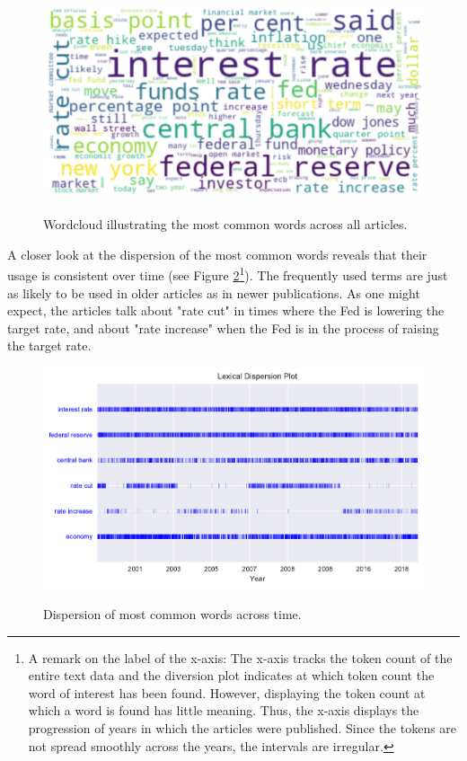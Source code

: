 \documentclass[11pt,a4paper,english,oneside]{book}
\numberwithin{equation}{chapter}
\begin{document}
\begin{figure}
	\caption{Wordcloud illustrating the most common words across all articles.}
	\centering
	\includegraphics[scale=0.2]{Images/wordcloud.pdf}
	\label{wcloud}
\end{figure}

A closer look at the dispersion of the most common words reveals that their usage is consistent over time (see Figure \ref{dispersion}\footnote{A remark on the label of the x-axis: The x-axis tracks the token count of the entire text data and the diversion plot indicates at which token count the word of interest has been found. However, displaying the token count at which a word is found has little meaning. Thus, the x-axis displays the progression of years in which the articles were published. Since the tokens are not spread smoothly across the years, the intervals are irregular.}). The frequently used terms are just as likely to be used in older articles as in newer publications. As one might expect, the articles talk about "rate cut" in times where the Fed is lowering the target rate, and about "rate increase" when the Fed is in the process of raising the target rate.

\begin{figure}
	\caption{Dispersion of most common words across time.}
	\centering
	\includegraphics[scale=1]{Images/dispersionplot.pdf}
	\label{dispersion}
\end{figure}
\end{document}

